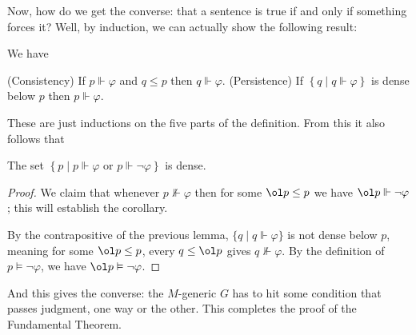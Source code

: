 \documentclass[11pt]{scrreprt}
\begin{document}
Now, how do we get the converse: that a sentence is true if and only if something forces it?
Well, by induction, we can actually show the following result:
\begin{lemma}
	We have
	\begin{enumerate}[(1)]
		\ii (Consistency) If $p \Vdash \varphi$ and $q \le p$ then $q \Vdash \varphi$.
		\ii (Persistence) If $\left\{ q \mid q \Vdash \varphi \right\}$
		is dense below $p$ then $p \Vdash \varphi$.
	\end{enumerate}
\end{lemma}
These are just inductions on the five parts of the definition.
From this it also follows that
\begin{corollary}[Completeness]
	The set $\left\{ p \mid p \Vdash \varphi \text{ or } p \Vdash \neg\varphi \right\}$
	is dense.
\end{corollary}
\begin{proof}
	We claim that whenever $p \not\Vdash \varphi$ then
	for some $\ol p \le p$ we have $\ol p \Vdash \neg\varphi$;
	this will establish the corollary.

	By the contrapositive of the previous lemma,
	$\{q \mid q \Vdash \varphi\}$ is not dense below $p$,
	meaning for some $\ol p \le p$, every $q \le \ol p$ gives $q \not\Vdash \varphi$.
	By the definition of $p \vDash \neg\varphi$,
	we have $\ol p \vDash \neg\varphi$.
\end{proof}
And this gives the converse: the $M$-generic $G$ has to hit some condition
that passes judgment, one way or the other.
This completes the proof of the Fundamental Theorem.
\end{document}
